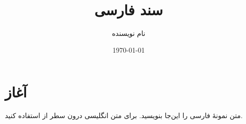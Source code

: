 \documentclass[11pt,a4paper]{article}
\title{سند فارسی}
\author{نام نویسنده}
\date{\today}
\begin{document}
\maketitle
\section{آغاز}
متن نمونهٔ فارسی را این‌جا بنویسید. برای متن انگلیسی درون سطر از  استفاده کنید.
\end{document}
